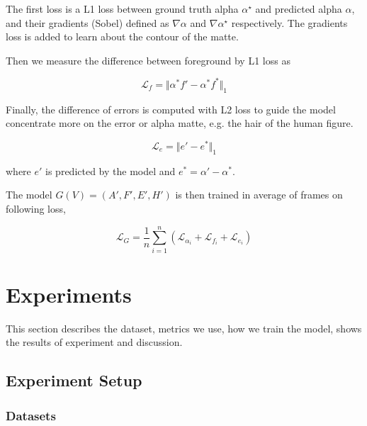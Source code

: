 \documentclass[final]{cvpr}
\begin{document}
The first loss is a L1 loss between ground truth alpha $\alpha^\star$ and predicted alpha $\alpha$, and their gradients (Sobel) defined as $\nabla \alpha$ and $\nabla \alpha^\star$ respectively.
The gradients loss is added to learn about the contour of the matte.

Then we measure the difference between foreground by L1 loss as

\begin{equation}\label{lossForeground}
    \mathcal{L}_f=\Vert\alpha^*f'-\alpha^*f^*\Vert_1
\end{equation}

Finally, the difference of errors is computed with L2 loss to guide the model concentrate more on the error or alpha matte, e.g. the hair of the human figure.

\begin{equation}\label{lossError}
    \mathcal{L}_e=\Vert e'-e^*\Vert_1
\end{equation}

where $e'$ is predicted by the model and $e^*=\alpha'-\alpha^*$.

The model $G(V)=(A',F',E',H')$ is then trained in average of frames on following loss,

\begin{equation}\label{lossG}
    \mathcal{L}_G=\frac{1}{n}\sum_{i=1}^n\left(\mathcal{L}_{\alpha_i}+\mathcal{L}_{f_i}+\mathcal{L}_{e_i}\right)
\end{equation}

\section{Experiments}

This section describes the dataset, metrics we use, how we train the model, shows the results of experiment and discussion.

\subsection{Experiment Setup}

\subsubsection{Datasets}
\end{document}
